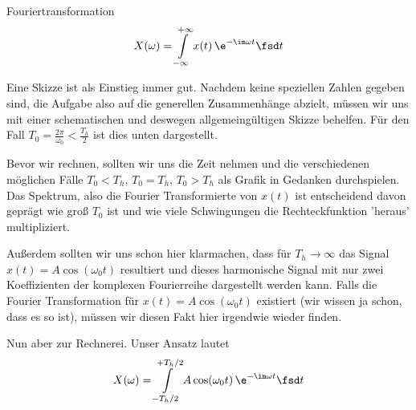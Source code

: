 \begin{Werkzeug}
Fouriertransformation
\begin{align}
X(\omega) = \int\limits_{-\infty}^{+\infty} x(t) \, \e^{-\im \omega t} \fsd t
\end{align}
\end{Werkzeug}
\begin{Ansatz}
Eine Skizze ist als Einstieg immer gut. Nachdem keine speziellen Zahlen gegeben sind,
die Aufgabe also auf die generellen Zusammenhänge abzielt, müssen wir uns mit einer
schematischen und deswegen allgemeingültigen Skizze behelfen. Für den Fall
$T_0=\frac{2\pi}{\omega_0}< \frac{T_h}{2}$ ist dies unten dargestellt.
%
\begin{center}
\end{center}
%
Bevor wir rechnen, sollten wir uns die Zeit nehmen und die verschiedenen
möglichen Fälle
$T_0<T_h$, $T_0=T_h$, $T_0>T_h$ als Grafik in Gedanken durchspielen.
Das Spektrum, also die Fourier Transformierte von $x(t)$ ist entscheidend davon
geprägt wie groß $T_0$ ist und wie viele Schwingungen die Rechteckfunktion 'heraus'
multipliziert.

Außerdem sollten wir uns schon hier klarmachen, dass für $T_h\to\infty$ das Signal
$x(t) = A \cos(\omega_0 t)$ resultiert und dieses harmonische Signal
mit nur zwei Koeffizienten der komplexen Fourierreihe dargestellt werden
kann.
%
Falls die Fourier Transformation für $x(t) = A \cos(\omega_0 t)$ existiert
(wir wissen ja schon, dass es so ist), müssen wir diesen Fakt hier
irgendwie wieder finden.

Nun aber zur Rechnerei.
%
Unser Ansatz lautet
\begin{align}
X(\omega) = \int\limits_{-T_h/2}^{+T_h/2} A \cos(\omega_0 t) \, \e^{-\im \omega t} \fsd t
\end{align}
\end{Ansatz}
